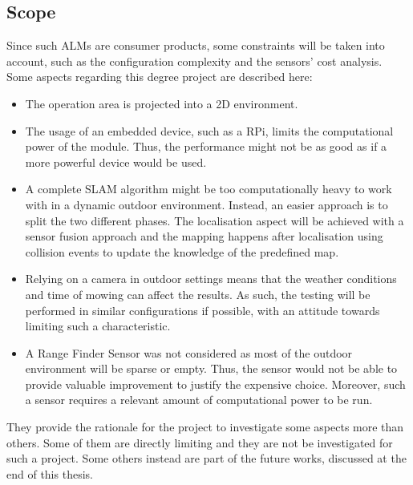 \subsection{Scope}

\noindent
Since such \glspl{ALM} are consumer products, some constraints will be taken into account, such as the configuration complexity and the sensors' cost analysis.
Some aspects regarding this degree project are described here:
\begin{itemize}
    \item The operation area is projected into a \Gls{2D} environment.
    \item The usage of an embedded device, such as a \gls{RPi}, limits the computational power of the module. Thus, the performance might not be as good as if a more powerful device would be used. %
    \item A complete \gls{SLAM} algorithm might be too computationally heavy to work with in a dynamic outdoor environment.
    Instead, an easier approach is to split the two different phases.
    The localisation aspect will be achieved with a sensor fusion approach and the mapping happens after localisation using collision events to update the knowledge of the predefined map.%
    \item Relying on a camera in outdoor settings means that the weather conditions and time of mowing can affect the results.
    As such, the testing will be performed in similar configurations if possible, with an attitude towards limiting such a characteristic.
    \item A Range Finder Sensor was not considered as most of the outdoor environment will be sparse or empty.
    Thus, the sensor would not be able to provide valuable improvement to justify the expensive choice.
    Moreover, such a sensor requires a relevant amount of computational power to be run.
\end{itemize}
They provide the rationale for the project to investigate some aspects more than others.
Some of them are directly limiting and they are not be investigated for such a project.
Some others instead are part of the future works, discussed at the end of this thesis.


